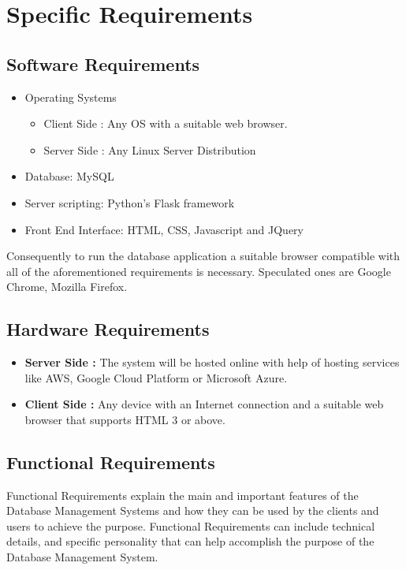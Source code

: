 \documentclass[12pt]{report}
\begin{document}
\section{Specific Requirements} 

\subsection{Software Requirements}

\begin{itemize}
\item Operating Systems
\begin{itemize}
\item Client Side : Any OS with a suitable web browser. 
\item Server Side : Any Linux Server Distribution

\end{itemize}

\item Database: MySQL 
\item  Server scripting: Python’s Flask framework
\item Front End Interface: HTML, CSS, Javascript and JQuery
\end{itemize}

Consequently to run the database application a suitable browser compatible with all of the aforementioned requirements is necessary. Speculated ones are Google Chrome, Mozilla Firefox.




\subsection{Hardware Requirements}
\begin{itemize}
\item \textbf{Server Side :} The system will be hosted online with help of hosting services like AWS, Google Cloud Platform or Microsoft Azure. 

\item\textbf{Client Side :}   Any device with an Internet connection and a suitable web browser that supports HTML 3 or above. 
\end{itemize}



\subsection{Functional Requirements}
Functional Requirements explain the main and important features of the Database Management Systems and how they can be used by the clients and users to achieve the purpose. Functional Requirements can include technical details, and specific personality that can help accomplish the purpose of the Database Management System.
\end{document}
